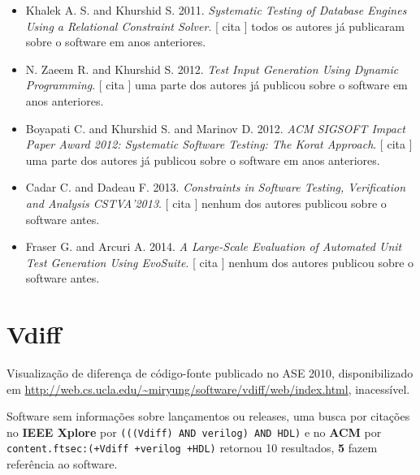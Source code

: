 \begin{itemize}
      [
          cita
      ]
todos os autores já publicaram sobre o software em anos anteriores.
\item Khalek A. S. and Khurshid S.
      2011.
        \textit{ Systematic Testing of Database Engines Using a Relational Constraint Solver}.
      [
          cita
      ]
todos os autores já publicaram sobre o software em anos anteriores.
\item N. Zaeem R. and Khurshid S.
      2012.
        \textit{ Test Input Generation Using Dynamic Programming}.
      [
          cita
      ]
uma parte dos autores já publicou sobre o software em anos anteriores.
\item Boyapati C. and Khurshid S. and Marinov D.
      2012.
        \textit{ ACM SIGSOFT Impact Paper Award 2012: Systematic Software Testing: The Korat Approach}.
      [
          cita
      ]
uma parte dos autores já publicou sobre o software em anos anteriores.
\item Cadar C. and Dadeau F.
      2013.
        \textit{ Constraints in Software Testing, Verification and Analysis CSTVA'2013}.
      [
          cita
      ]
nenhum dos autores publicou sobre o software antes.
\item Fraser G. and Arcuri A.
      2014.
        \textit{ A Large-Scale Evaluation of Automated Unit Test Generation Using EvoSuite}.
      [
          cita
      ]
nenhum dos autores publicou sobre o software antes.
\end{itemize}
\section{Vdiff}

Visualização de diferença de código-fonte
publicado no ASE 2010,
disponibilizado em \url{http://web.cs.ucla.edu/~miryung/software/vdiff/web/index.html},
inacessível.

Software sem informações sobre lançamentos ou releases,
uma busca por citações no {\bf IEEE Xplore} por
\texttt{(((Vdiff) AND verilog) AND HDL)}
e no {\bf ACM} por
\texttt{content.ftsec:(+Vdiff +verilog +HDL)}
retornou
10 resultados,
{\bf 5} fazem referência ao software.


